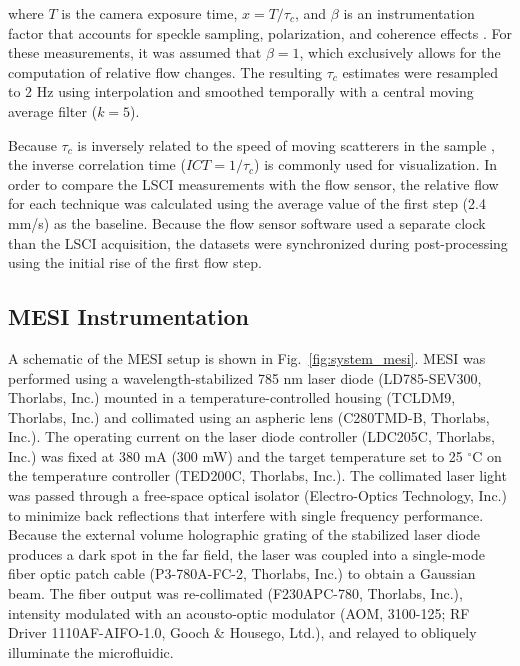 \documentclass[12pt]{spieman}
\begin{document}
\begin{spacing}{2}
\noindent where $T$ is the camera exposure time, $x=T/\tau_{c}$, and $\beta$ is an instrumentation factor that accounts for
speckle sampling, polarization, and coherence effects \cite{Bandyopadhyay:2005bg}. For these measurements, it was assumed that $\beta=1$, which exclusively allows for the computation of relative flow changes. The resulting $\tau_c$ estimates were resampled to 2 Hz using interpolation and smoothed temporally with a central moving average filter ($k=5$).

Because $\tau_c$ is inversely related to the speed of moving scatterers in the sample \cite{Bonner:1981hg}, the inverse correlation time ($ICT = 1/\tau_c$) is commonly used for visualization. In order to compare the LSCI measurements with the flow sensor, the relative flow for each technique was calculated using the average value of the first step (2.4 mm/s) as the baseline. Because the flow sensor software used a separate clock than the LSCI acquisition, the datasets were synchronized during post-processing using the initial rise of the first flow step.


\subsection{MESI Instrumentation}

A schematic of the MESI setup is shown in Fig.~\ref{fig:system_mesi}. MESI was performed using a wavelength-stabilized 785 nm laser diode (LD785-SEV300, Thorlabs, Inc.) mounted in a temperature-controlled housing (TCLDM9, Thorlabs, Inc.) and collimated using an aspheric lens (C280TMD-B, Thorlabs, Inc.). The operating current on the laser diode controller (LDC205C, Thorlabs, Inc.) was fixed at 380 mA (300 mW) and the target temperature set to 25 $^\circ$C on the temperature controller (TED200C, Thorlabs, Inc.). The collimated laser light was passed through a free-space optical isolator (Electro-Optics Technology, Inc.) to minimize back reflections that interfere with single frequency performance. Because the external volume holographic grating of the stabilized laser diode produces a dark spot in the far field, the laser was coupled into a single-mode fiber optic patch cable (P3-780A-FC-2, Thorlabs, Inc.) to obtain a Gaussian beam. The fiber output was re-collimated (F230APC-780, Thorlabs, Inc.), intensity modulated with an acousto-optic modulator (AOM, 3100-125; RF Driver 1110AF-AIFO-1.0, Gooch \& Housego, Ltd.), and relayed to obliquely illuminate the microfluidic.


\end{spacing}
\end{document}
